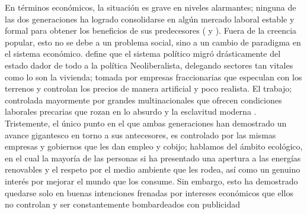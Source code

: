 En términos económicos, la situación es grave en niveles alarmantes; ninguna de las dos generaciones ha logrado consolidarse en algún mercado laboral
estable y formal para obtener los beneficios de sus predecesores ( y ). Fuera de la creencia
popular, esto no se debe a un problema social, sino a un cambio de paradigma en el sistema económico. \cite{bauman_estado} define que el sistema
político migró drásticamente del estado dador de todo a la política Neoliberalista, delegando sectores tan vitales como lo son la vivienda; tomada
por empresas fraccionarias que especulan con los terrenos y controlan los precios de manera artificial y poco realista. El trabajo; controlada mayormente
por grandes multinacionales que ofrecen condiciones laborales precarias que rozan en lo absurdo y la esclavitud moderna \cite{madsen1982poder}. Tristemente,
el único punto en el que ambas generaciones han demostrado un avance gigantesco en torno a sus antecesores, es controlado por las mismas empresas y gobiernos
que les dan empleo y cobijo; hablamos del ámbito ecológico, en el cual la mayoría de las personas si ha presentado una apertura a las energías renovables
y el respeto por el medio ambiente que les rodea, así como un genuino interés por mejorar el mundo que los consume. Sin embargo, esto ha demostrado
quedarse solo en buenas intenciones frenadas por intereses económicos que ellos no controlan y ser constantemente bombardeados con publicidad
